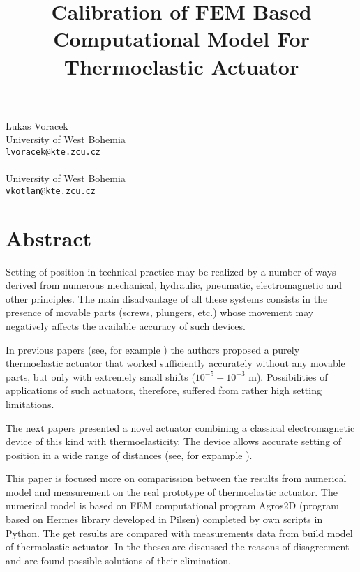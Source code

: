 \title{Calibration of FEM Based Computational Model For Thermoelastic Actuator}
\author{} \institute{}
\maketitle
\begin{center}
{\large Lukas Voracek}\\
University of West Bohemia\\
{\tt lvoracek@kte.zcu.cz}
\\ \vspace{4mm}{\large Vaclav Kotlan}\\
University of West Bohemia\\
{\tt vkotlan@kte.zcu.cz}

\end{center}

\section*{Abstract}

Setting of position in technical practice may be realized by a number of ways derived from numerous mechanical, hydraulic, pneumatic, electromagnetic and other principles. The main disadvantage of all these systems consists in the presence of movable parts (screws, plungers, etc.) whose movement may negatively affects the available accuracy of such devices.

In previous papers (see, for example \cite{actuator-1}) the authors proposed a purely thermoelastic actuator that worked sufficiently accurately without any movable parts, but only with extremely small shifts ($10^{-5} - 10^{-3}$ m). Possibilities of applications of such actuators, therefore, suffered from rather high setting limitations.

The next papers presented a novel actuator combining a classical electromagnetic device of this kind with thermoelasticity. The device allows accurate setting of position in a wide range of distances (see, for expample \cite{actuator-2}).

This paper is focused more on comparission between the results from numerical model and measurement on the real prototype of thermoelastic actuator. The numerical model is based on FEM computational program Agros2D (program based on Hermes library developed in Pilsen) completed by own scripts in Python. The get results are compared with measurements data from build model of thermolastic actuator. In the theses are discussed the reasons of disagreement and are found possible solutions of their elimination. 



